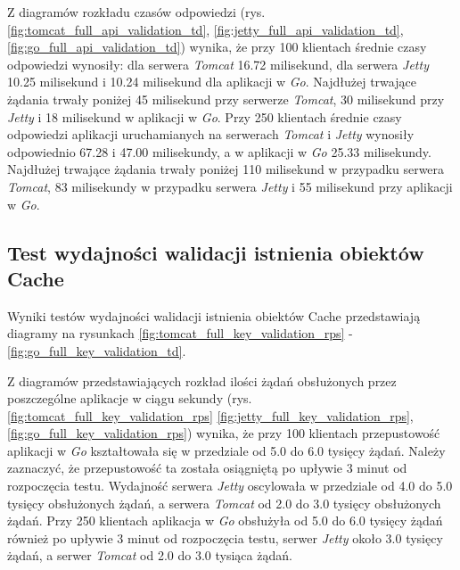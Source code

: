 Z diagramów rozkładu czasów odpowiedzi (rys. \ref{fig:tomcat_full_api_validation_td}, \ref{fig:jetty_full_api_validation_td}, \ref{fig:go_full_api_validation_td}) wynika, że przy 100 klientach średnie czasy odpowiedzi wynosiły: dla serwera \textsl{Tomcat} 16.72 milisekund, dla serwera \textsl{Jetty} 10.25 milisekund i 10.24 milisekund dla aplikacji w \textsl{Go}. Najdłużej trwające żądania trwały poniżej 45 milisekund przy serwerze \textsl{Tomcat}, 30 milisekund przy \textsl{Jetty} i 18 milisekund w aplikacji w \textsl{Go}. Przy 250 klientach średnie czasy odpowiedzi aplikacji uruchamianych na serwerach \textsl{Tomcat} i \textsl{Jetty} wynosiły odpowiednio 67.28 i 47.00 milisekundy, a w aplikacji w \textsl{Go} 25.33 milisekundy. Najdłużej trwające żądania trwały poniżej 110 milisekund w przypadku serwera \textsl{Tomcat}, 83 milisekundy w przypadku serwera \textsl{Jetty} i 55 milisekund przy aplikacji w \textsl{Go}.


\clearpage

\subsection{Test wydajności walidacji istnienia obiektów Cache}
Wyniki testów wydajności walidacji istnienia obiektów Cache przedstawiają diagramy na rysunkach \ref{fig:tomcat_full_key_validation_rps} - \ref{fig:go_full_key_validation_td}.              

Z diagramów przedstawiających rozkład ilości żądań obsłużonych przez poszczególne aplikacje w ciągu sekundy  (rys. \ref{fig:tomcat_full_key_validation_rps} \ref{fig:jetty_full_key_validation_rps}, \ref{fig:go_full_key_validation_rps}) wynika, że przy 100 klientach przepustowość aplikacji w \textsl{Go} kształtowała się w przedziale od 5.0 do 6.0 tysięcy żądań. Należy zaznaczyć, że przepustowość ta została osiągniętą po upływie 3 minut od rozpoczęcia testu. Wydajność serwera \textsl{Jetty} oscylowała w przedziale od 4.0 do 5.0 tysięcy obsłużonych żądań, a serwera \textsl{Tomcat} od 2.0 do 3.0 tysięcy obsłużonych żądań. Przy 250 klientach aplikacja w \textsl{Go} obsłużyła od 5.0 do 6.0 tysięcy żądań również po upływie 3 minut od rozpoczęcia testu, serwer \textsl{Jetty} około 3.0 tysięcy żądań, a serwer \textsl{Tomcat} od 2.0 do 3.0 tysiąca żądań.

